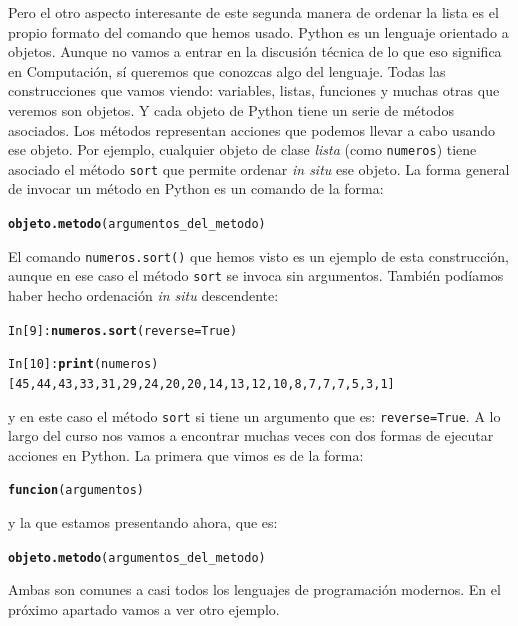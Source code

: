 \documentclass[10pt,a4paper]{article}\usepackage[]{graphicx}\usepackage[]{color}
\makeatletter
\newcommand{\hlstd}[1]{\textcolor[rgb]{0.345,0.345,0.345}{#1}}%
\newcommand{\hlkwd}[1]{\textcolor[rgb]{0.737,0.353,0.396}{\textbf{#1}}}%
\newenvironment{kframe}{%
 \def\at@end@of@kframe{}%
 \ifinner\ifhmode%
  \def\at@end@of@kframe{\end{minipage}}%
  \begin{minipage}{\columnwidth}%
 \fi\fi%
 \def\FrameCommand##1{\hskip\@totalleftmargin \hskip-\fboxsep
 \colorbox{shadecolor}{##1}\hskip-\fboxsep
     \hskip-\linewidth \hskip-\@totalleftmargin \hskip\columnwidth}%
 \MakeFramed {\advance\hsize-\width
   \@totalleftmargin\z@ \linewidth\hsize
   \@setminipage}}%
 {\par\unskip\endMakeFramed%
 \at@end@of@kframe}
\newenvironment{knitrout}{}{} %
\newcounter {cont01}
\makeatother
\begin{document}
Pero el otro aspecto interesante de este segunda manera de ordenar la lista  es el propio formato del comando que hemos usado. Python es un lenguaje {\sf orientado a objetos}. Aunque no vamos a entrar en la discusión técnica de lo que eso significa en Computación, sí queremos que conozcas algo del lenguaje. Todas las construcciones que vamos viendo: variables, listas, funciones y muchas otras que veremos son {\sf objetos}. Y cada objeto de Python tiene un serie de {\sf métodos} asociados. Los métodos representan acciones que podemos llevar a cabo usando ese objeto. Por ejemplo, cualquier objeto de clase {\em lista} (como  {\tt numeros}) tiene asociado el método {\tt sort} que permite ordenar {\em in situ} ese objeto. La forma general de invocar un método en Python es un comando de la forma:
\begin{knitrout}
\color{fgcolor}\begin{kframe}
\begin{alltt}
\hlkwd{objeto.metodo}\hlstd{(argumentos_del_metodo)}
\end{alltt}
\end{kframe}
\end{knitrout}
El comando {\tt numeros.sort()} que hemos visto es un ejemplo de esta construcción, aunque en ese caso el método {\tt sort} se invoca sin argumentos. También podíamos haber hecho ordenación {\em in situ} descendente:
\begin{knitrout}
\color{fgcolor}\begin{kframe}
\begin{alltt}
In [9]: \hlkwd{numeros.sort}(reverse=True)

In [10]: \hlkwd{print}(numeros)
[45, 44, 43, 33, 31, 29, 24, 20, 20, 14, 13, 12, 10, 8, 7, 7, 7, 5, 3, 1]
\end{alltt}
\end{kframe}
\end{knitrout}
y en este caso el método {\tt sort} si tiene un argumento que es: {\tt reverse=True}. A lo largo del curso nos vamos a encontrar muchas veces con dos formas de ejecutar acciones en Python. La primera que vimos es de la forma:
\begin{knitrout}
\color{fgcolor}\begin{kframe}
\begin{alltt}
\hlkwd{funcion}\hlstd{(argumentos)}
\end{alltt}
\end{kframe}
\end{knitrout}
y la que estamos presentando ahora, que es:
\begin{knitrout}
\color{fgcolor}\begin{kframe}
\begin{alltt}
\hlkwd{objeto.metodo}\hlstd{(argumentos_del_metodo)}
\end{alltt}
\end{kframe}
\end{knitrout}
Ambas son comunes a casi todos los lenguajes de programación modernos. En el próximo apartado vamos a ver otro ejemplo.
\end{document}

